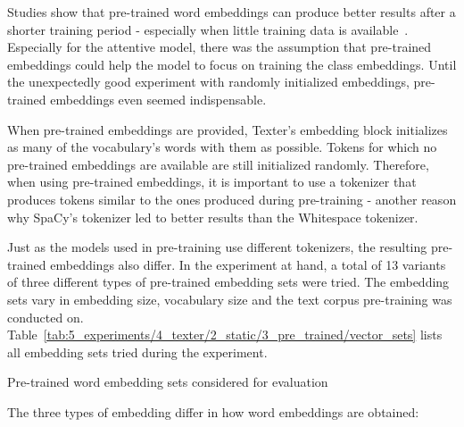 Studies show that pre-trained word embeddings can produce better results after a shorter training period - especially when little training data is available~\cite{}. Especially for the attentive model, there was the assumption that pre-trained embeddings could help the model to focus on training the class embeddings. Until the unexpectedly good experiment with randomly initialized embeddings, pre-trained embeddings even seemed indispensable.

When pre-trained embeddings are provided, Texter's embedding block initializes as many of the vocabulary's words with them as possible. Tokens for which no pre-trained embeddings are available are still initialized randomly. Therefore, when using pre-trained embeddings, it is important to use a tokenizer that produces tokens similar to the ones produced during pre-training - another reason why SpaCy's tokenizer led to better results than the Whitespace tokenizer.

Just as the models used in pre-training use different tokenizers, the resulting pre-trained embeddings also differ. In the experiment at hand, a total of 13 variants of three different types of pre-trained embedding sets were tried. The embedding sets vary in embedding size, vocabulary size and the text corpus pre-training was conducted on. Table~\ref{tab:5_experiments/4_texter/2_static/3_pre_trained/vector_sets} lists all embedding sets tried during the experiment.

\begin{table}[h]
    \centering
    
    \caption{Pre-trained word embedding sets considered for evaluation}
    \label{tab:5_experiments/4_texter/2_static/3_pre_trained/vector_sets}
\end{table}

The three types of embedding differ in how word embeddings are obtained:

